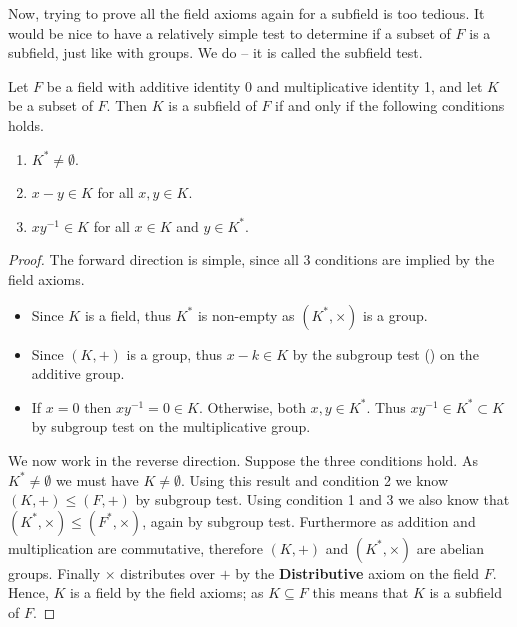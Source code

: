 Now, trying to prove all the field axioms again for a subfield is too tedious. It would be nice to have a relatively simple test to determine if a subset of $F$ is a subfield, just like with groups. We do -- it is called the subfield test.
\begin{theorem}\label{thrm-subfield-test}
    Let $F$ be a field with additive identity 0 and multiplicative identity 1, and let $K$ be a subset of $F$. Then $K$ is a subfield of $F$ if and only if the following conditions holds.
    \begin{enumerate}
        \item $K^\ast \neq \emptyset$.
        \item $x - y \in K$ for all $x, y \in K$.
        \item $xy^{-1} \in K$ for all $x \in K$ and $y \in K^\ast$.
    \end{enumerate}
\end{theorem}
\begin{proof}
    The forward direction is simple, since all 3 conditions are implied by the field axioms.
    \begin{itemize}
        \item Since $K$ is a field, thus $K^\ast$ is non-empty as $(K^\ast, \times)$ is a group.
        \item Since $(K, +)$ is a group, thus $x - k \in K$ by the subgroup test () on the additive group.
        \item If $x = 0$ then $xy^{-1} = 0 \in K$. Otherwise, both $x, y \in K^\ast$. Thus $xy^{-1} \in K^\ast \subset K$ by subgroup test on the multiplicative group.
    \end{itemize}

    We now work in the reverse direction. Suppose the three conditions hold. As $K^\ast \neq \emptyset$ we must have $K \neq \emptyset$. Using this result and condition 2 we know $(K, +) \leq (F, +)$ by subgroup test. Using condition 1 and 3 we also know that $(K^\ast, \times) \leq (F^\ast, \times)$, again by subgroup test. Furthermore as addition and multiplication are commutative, therefore $(K, +)$ and $(K^\ast, \times)$ are abelian groups. Finally $\times$ distributes over $+$ by the \textbf{Distributive} axiom on the field $F$. Hence, $K$ is a field by the field axioms; as $K \subseteq F$ this means that $K$ is a subfield of $F$.
\end{proof}

